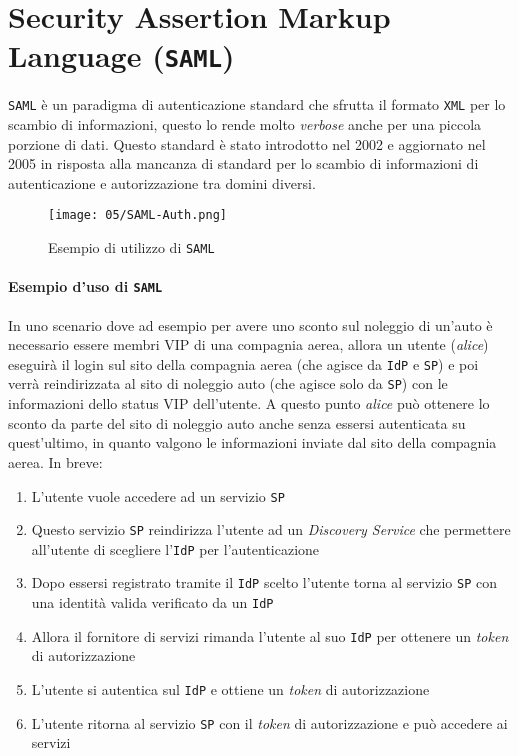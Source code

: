 \section{Security Assertion Markup Language (\texttt{SAML})}
    \texttt{SAML} è un paradigma di autenticazione standard che sfrutta il formato \texttt{XML} per lo scambio di informazioni, questo lo rende molto \textit{verbose} anche per una piccola porzione di dati. Questo standard è stato introdotto nel 2002 e aggiornato nel 2005 in risposta alla mancanza di standard per lo scambio di informazioni di autenticazione e autorizzazione tra domini diversi.
    
    \begin{wrapfigure}{r}{0.25\textwidth}
        \centering
        \texttt{[image: 05/SAML-Auth.png]}
        \caption{Esempio di utilizzo di \texttt{SAML}}
    \end{wrapfigure}
    \paragraph{Esempio d'uso di \texttt{SAML}} In uno scenario dove ad esempio per avere uno sconto sul noleggio di un'auto è necessario essere membri VIP di una compagnia aerea, allora un utente (\textit{alice}) eseguirà il login sul sito della compagnia aerea (che agisce da \texttt{IdP} e \texttt{SP}) e poi verrà reindirizzata al sito di noleggio auto (che agisce solo da \texttt{SP}) con le informazioni dello status VIP dell'utente. A questo punto \textit{alice} può ottenere lo sconto da parte del sito di noleggio auto anche senza essersi autenticata su quest'ultimo, in quanto valgono le informazioni inviate dal sito della compagnia aerea.\newline
    In breve:
        \begin{enumerate}
            \item L'utente vuole accedere ad un servizio \texttt{SP}
            \item Questo servizio \texttt{SP} reindirizza l'utente ad un \textit{Discovery Service} che permettere all'utente di scegliere l'\texttt{IdP} per l'autenticazione
            \item Dopo essersi registrato tramite il \texttt{IdP} scelto l'utente torna al servizio \texttt{SP} con una identità valida verificato da un \texttt{IdP}
            \item Allora il fornitore di servizi rimanda l'utente al suo \texttt{IdP} per ottenere un \textit{token} di autorizzazione
            \item L'utente si autentica sul \texttt{IdP} e ottiene un \textit{token} di autorizzazione
            \item L'utente ritorna al servizio \texttt{SP} con il \textit{token} di autorizzazione e può accedere ai servizi
        \end{enumerate}
    
